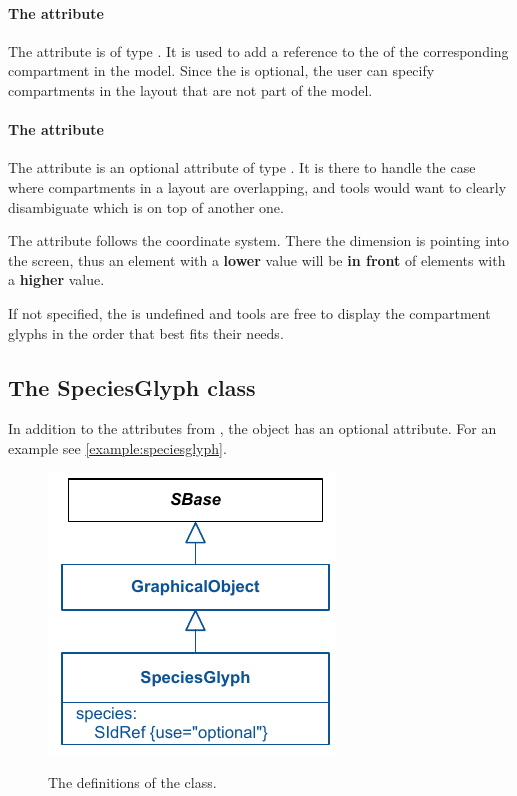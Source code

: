 \paragraph{The  attribute}
The  attribute is of type . It 
is used to add a reference to the  of the corresponding 
compartment in the model. Since the  is optional, the 
user can specify compartments in the layout that are not part of the 
model. 

\paragraph{The  attribute}
The  attribute is an optional attribute of type 
. It is there to handle the case where compartments in a layout are overlapping, and tools would want to clearly disambiguate which \CompartmentGlyph is on top of another one. 

The  attribute follows the coordinate system. There 
the  dimension is pointing into the screen, thus an element 
with a \textbf{lower}  value will be \textbf{in front} of 
elements with a \textbf{higher} value.

If not specified, the  is undefined and tools are free to 
display the compartment glyphs in the order that best fits their needs. 

\subsection{The SpeciesGlyph class}
\label{speciesglyph-class}
In addition to the attributes from \GraphicalObject, the \SpeciesGlyph 
object has an optional  attribute. For an example see \ref{example:speciesglyph}.

\begin{figure}[!h]
\includegraphics{uml/layout-speciesglyph-uml}\\
\label{uml:speciesglyph}
\caption{The definitions of the \SpeciesGlyph class.}
\end{figure}

